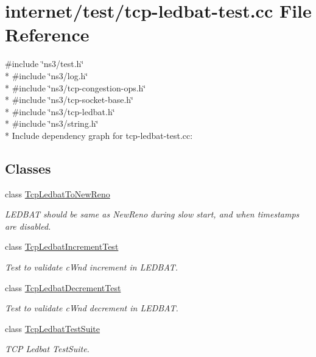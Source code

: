 \hypertarget{tcp-ledbat-test_8cc}{}\section{internet/test/tcp-\/ledbat-\/test.cc File Reference}
\label{tcp-ledbat-test_8cc}
{\ttfamily \#include \char`\"{}ns3/test.\+h\char`\"{}}\\*
{\ttfamily \#include \char`\"{}ns3/log.\+h\char`\"{}}\\*
{\ttfamily \#include \char`\"{}ns3/tcp-\/congestion-\/ops.\+h\char`\"{}}\\*
{\ttfamily \#include \char`\"{}ns3/tcp-\/socket-\/base.\+h\char`\"{}}\\*
{\ttfamily \#include \char`\"{}ns3/tcp-\/ledbat.\+h\char`\"{}}\\*
{\ttfamily \#include \char`\"{}ns3/string.\+h\char`\"{}}\\*
Include dependency graph for tcp-\/ledbat-\/test.cc\+:
\subsection*{Classes}
\begin{DoxyCompactItemize}
\item 
class \hyperlink{classTcpLedbatToNewReno}{Tcp\+Ledbat\+To\+New\+Reno}
\begin{DoxyCompactList}\small\item\em L\+E\+D\+B\+AT should be same as New\+Reno during slow start, and when timestamps are disabled. \end{DoxyCompactList}\item 
class \hyperlink{classTcpLedbatIncrementTest}{Tcp\+Ledbat\+Increment\+Test}
\begin{DoxyCompactList}\small\item\em Test to validate c\+Wnd increment in L\+E\+D\+B\+AT. \end{DoxyCompactList}\item 
class \hyperlink{classTcpLedbatDecrementTest}{Tcp\+Ledbat\+Decrement\+Test}
\begin{DoxyCompactList}\small\item\em Test to validate c\+Wnd decrement in L\+E\+D\+B\+AT. \end{DoxyCompactList}\item 
class \hyperlink{classTcpLedbatTestSuite}{Tcp\+Ledbat\+Test\+Suite}
\begin{DoxyCompactList}\small\item\em T\+CP Ledbat Test\+Suite. \end{DoxyCompactList}\end{DoxyCompactItemize}
